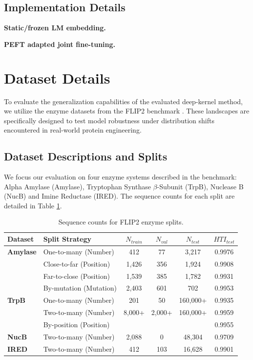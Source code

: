 \documentclass{article}
\theoremstyle{plain}
\theoremstyle{definition}
\theoremstyle{remark}
\begin{document}
\subsection{Implementation Details}

\textbf{Static/frozen LM embedding.} 

\textbf{PEFT adapted joint fine-tuning.}

\section{Dataset Details}
To evaluate the generalization capabilities of the evaluated deep-kernel method, we utilize the enzyme datasets from the FLIP2 benchmark \cite{miller2026flip2}. These landscapes are specifically designed to test model robustness under distribution shifts encountered in real-world protein engineering.

\subsection{Dataset Descriptions and Splits}

We focus our evaluation on four enzyme systems described in the benchmark: Alpha Amylase (Amylase), Tryptophan Synthase $\beta$-Subunit (TrpB), Nuclease B (NucB) and Imine Reductase (IRED). The sequence counts for each split are detailed in Table \ref{tab:flip2_stats}.

\begin{table}[ht]
\centering
\caption{Sequence counts for FLIP2 enzyme splits.}
\label{tab:flip2_stats}
\begin{small}
\begin{tabular}{llcccc}
\toprule
\textbf{Dataset} & \textbf{Split Strategy} & \textbf{$N_{train}$} & \textbf{$N_{val}$} & \textbf{$N_{test}$} & \textbf{$HTI_{test}$} \\
\midrule
\textbf{Amylase} & One-to-many (Number) & 412 & 77 & 3,217 & 0.9976 \\
                 & Close-to-far (Position) & 1,426 & 356 & 1,924 & 0.9908\\
                 & Far-to-close (Position) & 1,539 & 385 & 1,782 & 0.9931 \\
                 & By-mutation (Mutation) & 2,403 & 601 & 702 & 0.9953 \\
\midrule
\textbf{TrpB}    & One-to-many (Number) & 201 & 50 & 160,000+ & 0.9935\\
                 & Two-to-many (Number) & 8,000+ & 2,000+ & 160,000+ & 0.9959 \\
                 & By-position (Position) & & & & 0.9955 \\
\midrule
\textbf{NucB}    & Two-to-many (Number) & 2,088 & 0 & 48,304 & 0.9709 \\
\midrule
\textbf{IRED}    & Two-to-many (Number) & 412 & 103 & 16,628 & 0.9901 \\
\bottomrule
\end{tabular}
\end{small}
\end{table}
\end{document}
